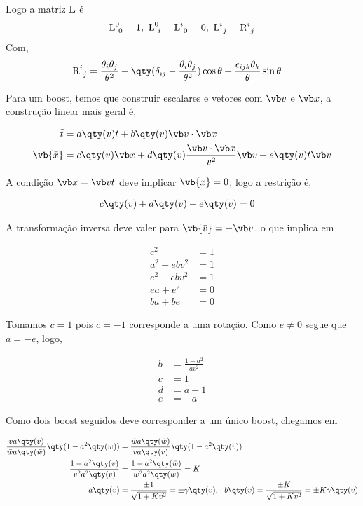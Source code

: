 \documentclass[twoside]{amsart}
\numberwithin{equation}{section}
\begin{document}
\begin{refsection}
Logo a matriz $\textup L$ é $${\textup L}^{0}_{\ 0}=1,\ {\textup L}^0_{\ i}={\textup L}^{i}_{\ 0}=0,\ {\textup L}^{i}_{\ j}={\textup R}^{i}_{\ j}$$
Com,
\begin{align}
    {\textup R}^{i}_{\ j}&=\frac{\theta_i\theta_{j}}{\theta^2}+\qty(\delta_{ij}-\frac{\theta_{i}\theta_j}{\theta^2})\cos\theta+\frac{\epsilon_{ijk}\theta_k}{\theta}\sin\theta
\end{align}

Para um boost, temos que construir escalares e vetores com $\vb v$ e $\vb x$, a construção linear mais geral é,

\begin{align}
    {\bar t}&=a\qty(v)t+b\qty(v)\vb v\cdot \vb x\\
    \vb {\bar x}&=c\qty(v)\vb x+d\qty(v)\frac{\vb v\cdot \vb x}{v^2}\vb v+e\qty(v)t\vb v
\end{align}

A condição $\vb x=\vb v t$ deve implicar $\vb{\bar x}=0$, logo a restrição é,

\begin{align}
    c\qty(v)+d\qty(v)+e\qty(v)&=0
\end{align}

A transformação inversa deve valer para $\vb {\bar v}=-\vb v$, o que implica em

\begin{align}
    c^2&=1\\
    a^2-ebv^2&=1\\
    e^2-ebv^2&=1\\
    ea+e^2&=0\\
    ba+be&=0
\end{align}

Tomamos $c=1$ pois $c=-1$ corresponde a uma rotação. Como $e\neq 0$ segue que $a=-e$, logo,

\begin{align}
    b&=\frac{1-a^2}{av^2}\\
    c&=1\\
    d&=a-1\\
    e&=-a
\end{align}

Como dois boost seguidos deve corresponder a um único boost, chegamos em

\begin{align}
    \frac{va\qty(v)}{\bar wa\qty(\bar w)}\qty(1-a^2\qty(\bar w))&=\frac{\bar wa\qty(\bar w)}{va\qty(v)}\qty(1-a^2\qty(v))\\
    \frac{1-a^2\qty(v)}{v^2a^2\qty(v)}&=\frac{1-a^2\qty(\bar w)}{{\bar w}^2a^2\qty({\bar w})}=K\\
    a\qty(v)&=\frac{\pm 1}{\sqrt{1+Kv^2}}=\pm \gamma\qty(v),\ \ b\qty(v)=\frac{\pm K}{\sqrt{1+Kv^2}}=\pm K\gamma\qty(v) 
\end{align}


\end{refsection}
\end{document}
